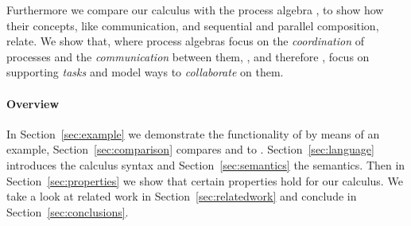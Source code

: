 Furthermore we compare our calculus with the process algebra \CSP, to show how their concepts, like communication, and sequential and parallel composition, relate.
We show that, where process algebras focus on the \emph{coordination} of processes and the \emph{communication} between them,
\TOP, and therefore \TOPHAT, focus on supporting \emph{tasks} and model ways to \emph{collaborate} on them.



\paragraph{Overview}

In Section~\ref{sec:example} we demonstrate the functionality of \TOPHAT by means of an example,
Section~\ref{sec:comparison} compares \TOP and \TOPHAT to \CSP.
Section~\ref{sec:language} introduces the \TOPHAT calculus syntax
and Section~\ref{sec:semantics} the semantics.
Then in Section~\ref{sec:properties} we show that certain properties hold for our calculus.
We take a look at related work in Section~\ref{sec:relatedwork}
and conclude in Section~\ref{sec:conclusions}.
